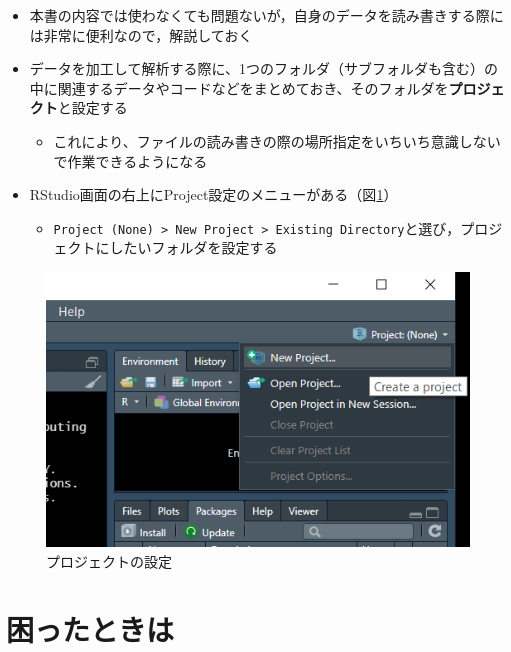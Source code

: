\documentclass[
  xelatex,ja=standard, b5paper]{bxjsbook}
\providecommand{\tightlist}{%
  \setlength{\itemsep}{0pt}\setlength{\parskip}{0pt}}
\begin{document}
\begin{itemize}
\tightlist
\item
  本書の内容では使わなくても問題ないが，自身のデータを読み書きする際には非常に便利なので，解説しておく
\item
  データを加工して解析する際に、1つのフォルダ（サブフォルダも含む）の中に関連するデータやコードなどをまとめておき、そのフォルダを\textbf{プロジェクト}と設定する

  \begin{itemize}
  \tightlist
  \item
    これにより、ファイルの読み書きの際の場所指定をいちいち意識しないで作業できるようになる
  \end{itemize}
\item
  RStudio画面の右上にProject設定のメニューがある（図\ref{fig:project}）

  \begin{itemize}
  \tightlist
  \item
    \texttt{Project\ (None)\ \textgreater{}\ New\ Project\ \textgreater{}\ Existing\ Directory}と選び，プロジェクトにしたいフォルダを設定する
  \end{itemize}
\end{itemize}

\begin{figure}

{\centering \includegraphics[width=7.11in]{images/project} 

}

\caption{プロジェクトの設定}\label{fig:project}
\end{figure}

\hypertarget{p-help}{%
\section{困ったときは}\label{p-help}}
\end{document}
